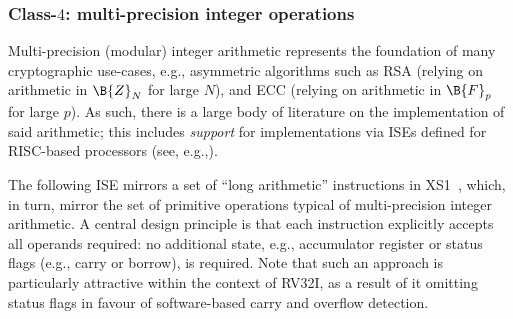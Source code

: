 
\subsubsection{Class-$4$: multi-precision integer operations}
\label{sec:bg:feature:4}

Multi-precision (modular) integer arithmetic represents the foundation
of many cryptographic use-cases, e.g., asymmetric algorithms such as
RSA (relying on arithmetic in $\B{Z}_N$ for large $N$),
and
ECC (relying on arithmetic in $\B{F}_p$ for large $p$).
As such, there is a large body of literature on the implementation of
said arithmetic; this includes {\em support} for implementations via
ISEs defined for RISC-based processors
(see, e.g.,\cite{SCARV:GroKam:03,SCARV:GroKam:04}).

The following ISE mirrors a set of ``long arithmetic'' instructions in
XS1~\cite[Section 18]{SCARV:XS1:09}, which, in turn, mirror the set of
primitive operations typical of multi-precision integer arithmetic.  
A central design principle is that each instruction explicitly accepts 
all operands required: no additional state, e.g., accumulator register
or status flags (e.g., carry or borrow), is required.  Note that such
an approach is particularly attractive within the context of RV32I, as
a result of it omitting status flags in favour of software-based carry
and overflow detection.



